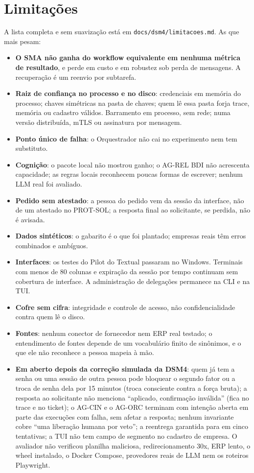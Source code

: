 \documentclass[10pt,a4paper]{article}
\newcommand{\code}[1]{\texttt{#1}}
\begin{document}
\section{Limitações}\label{sec:limitacoes}
A lista completa e sem suavização está em \code{docs/dsm4/limitacoes.md}. As que mais pesam:
\begin{itemize}
  \item \textbf{O SMA não ganha do workflow equivalente em nenhuma métrica de resultado}, e perde em custo e em
        robustez sob perda de mensagens. A recuperação é um reenvio por subtarefa.
  \item \textbf{Raiz de confiança no processo e no disco}: credenciais em memória do processo; chaves simétricas na
        pasta de chaves; quem lê essa pasta forja trace, memória ou cadastro válidos. Barramento em processo, sem rede;
        numa versão distribuída, mTLS ou assinatura por mensagem.
  \item \textbf{Ponto único de falha}: o Orquestrador não cai no experimento nem tem substituto.
  \item \textbf{Cognição}: o pacote local não mostrou ganho; o AG-REL BDI não acrescenta capacidade; as regras locais
        reconhecem poucas formas de escrever; nenhum LLM real foi avaliado.
  \item \textbf{Pedido sem atestado}: a pessoa do pedido vem da sessão da interface, não de um atestado no PROT-SOL; a
        resposta final ao solicitante, se perdida, não é avisada.
  \item \textbf{Dados sintéticos}: o gabarito é o que foi plantado; empresas reais têm erros combinados e ambíguos.
  \item \textbf{Interfaces}: os testes do Pilot do Textual passaram no Windows. Terminais com menos de 80 colunas e expiração da sessão por tempo continuam sem cobertura de interface. A administração de delegações permanece na CLI e na TUI.
  \item \textbf{Cofre sem cifra}: integridade e controle de acesso, não confidencialidade contra quem lê o disco.
  \item \textbf{Fontes}: nenhum conector de fornecedor nem ERP real testado; o entendimento de fontes depende de um
        vocabulário finito de sinônimos, e o que ele não reconhece a pessoa mapeia à mão.
  \item \textbf{Em aberto depois da correção simulada da DSM4}: quem já tem a senha ou uma sessão de outra pessoa pode
        bloquear o segundo fator ou a troca de senha dela por 15 minutos (troca consciente contra a força bruta); a
        resposta ao solicitante não menciona \enquote{aplicado, confirmação inválida} (fica no trace e no ticket); o
        AG-CIN e o AG-ORC terminam com intenção aberta em parte das execuções com falha, sem afetar a resposta; nenhum
        invariante cobre \enquote{uma liberação humana por veto}; a reentrega garantida para em cinco tentativas; a TUI
        não tem campo de segmento no cadastro de empresa. O avaliador não verificou planilha maliciosa,
        redirecionamento 30x, ERP lento, o wheel instalado, o Docker Compose, provedores reais de LLM nem os roteiros
        Playwright.
\end{itemize}
\end{document}
